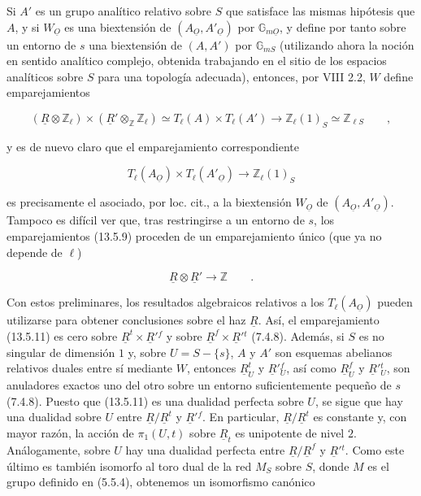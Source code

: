 \noindent
Si $A'$ es un grupo analítico relativo sobre $S$ que satisface las
mismas hipótesis que $A$, y si $W_{\underline O}$ es una biextensión de
$(A_{\underline O},A'_{\underline O})$ por
$\mathbb G_{m\underline O}$, y define por tanto sobre un entorno de $s$
una biextensión de $(A,A')$ por $\mathbb G_{mS}$ (utilizando ahora la
noción en sentido analítico complejo, obtenida trabajando en el sitio
de los espacios analíticos sobre $S$ para una topología adecuada),
entonces, por VIII 2.2, $W$ define emparejamientos

\begin{equation}\tag{13.5.9}
 (\underline R\otimes\mathbb Z_\ell)\times
 (\underline R'\otimes_{\mathbb Z}\mathbb Z_\ell)
 \simeq T_\ell(A)\times T_\ell(A')
 \longrightarrow\mathbb Z_\ell(1)_S
 \simeq\mathbb Z_{\ell S}\qquad ,
\end{equation}

\noindent
y es de nuevo claro que el emparejamiento correspondiente

\begin{equation}\tag{13.5.10}
 T_\ell(A_{\underline O})\times T_\ell(A'_{\underline O})
 \longrightarrow\mathbb Z_\ell(1)_S
\end{equation}

\noindent
es precisamente el asociado, por loc. cit., a la biextensión
$W_{\underline O}$ de $(A_{\underline O},A'_{\underline O})$. Tampoco
es difícil ver que, tras restringirse a un entorno de $s$, los
emparejamientos (13.5.9) proceden de un emparejamiento único (que ya no
depende de $\ell$)

\begin{equation}\tag{13.5.11}
 \underline R\otimes\underline R'\longrightarrow\mathbb Z
 \qquad .
\end{equation}

\noindent
Con estos preliminares, los resultados algebraicos relativos a los
$T_\ell(A_{\underline O})$ pueden utilizarse para obtener conclusiones
sobre el haz $\underline R$. Así, el emparejamiento (13.5.11) es cero
sobre $\underline R^t\times\underline R'{}^f$ y sobre
$\underline R^f\times\underline R'{}^t$ (7.4.8). Además, si $S$ es no
singular de dimensión $1$ y, sobre $U=S-\{s\}$, $A$ y $A'$ son esquemas
abelianos relativos duales entre sí mediante $W$, entonces
$\underline R^t_U$ y $\underline R'{}^f_U$, así como
$\underline R^f_U$ y $\underline R'{}^t_U$, son anuladores exactos uno
del otro sobre un entorno suficientemente pequeño de $s$ (7.4.8).
Puesto que (13.5.11) es una dualidad perfecta sobre $U$, se sigue que
hay una dualidad sobre $U$ entre $\underline R/\underline R^t$ y
$\underline R'{}^f$. En particular, $\underline R/\underline R^t$ es
constante y, con mayor razón, la acción de $\pi_1(U,t)$ sobre
$\underline R_t$ es unipotente de nivel $2$. Análogamente, sobre $U$
hay una dualidad perfecta entre $\underline R/\underline R^f$ y
$\underline R'{}^t$. Como este último es también isomorfo al toro dual
de la red $M_S$ sobre $S$, donde $M$ es el grupo definido en (5.5.4),
obtenemos un isomorfismo canónico


